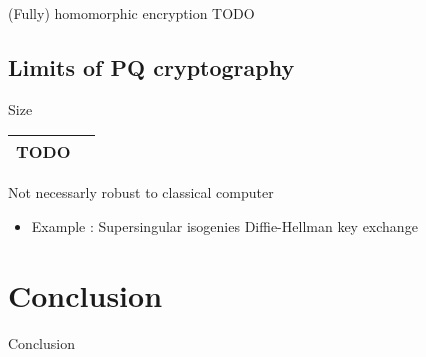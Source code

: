 \documentclass{beamer}
\begin{document}
\begin{frame}{(Fully) homomorphic encryption}
	TODO
\end{frame}

\subsection{Limits of PQ cryptography}
\begin{frame}
	Size
	\begin{tabular}{|c|c|}
		\hline
		TODO & \\
		\hline
	\end{tabular}
\end{frame}

\begin{frame}{Not necessarly robust to classical computer}
	\begin{itemize}
		\item Example : Supersingular isogenies Diffie-Hellman key exchange
	\end{itemize}
\end{frame}

\section{Conclusion}
\begin{frame}{Conclusion}
\begin{linenumbers}
\end{linenumbers}
\end{frame}
\end{document}
